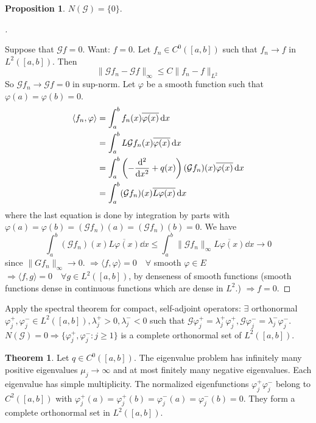 \documentclass{article}
\theoremstyle{definition}
\newtheorem{thm}{Theorem}
\newtheorem{prop}{Proposition}
\newenvironment{proofs}[1][\proofname]{%
  \begin{proof}[#1]$ $\par\nobreak\ignorespaces
}{%
  \end{proof}
}
\newcommand{\G}{\mathcal G}
\begin{document}
\begin{prop}
	$N(\G) = \{0\}$.
\end{prop}

\begin{proofs}
	Suppose that $\G f = 0$.
	Want: $f = 0$.
	Let $f_n \in C^0([a, b])$ such that $f_n \to f$ in $L^2([a, b])$.
	Then 
	\[
		\|\G f_n - \G f\|_{\infty} \leq C \|f_n - f\|_{L^2}
	\]
	So $\G f_n \to \G f = 0$ in sup-norm.
	Let $\varphi$ be a smooth function such that $\varphi(a) = \varphi(b) = 0$.
	\[
		\begin{split}
			\langle f_n , \varphi \rangle &= \int_a^b f_n(x) \overline{\varphi(x)} \dd{x}\\
			&= \int_a^b L \G f_n(x) \overline{\varphi(x)} \dd{x}\\
			&= \int_a^b \left( - \dv[2]{x} + q(x) \right)(\G f_n)(x) \overline{\varphi(x)} \dd{x}\\
			&= \int_a^b (\G f_n)(x) \overline{L \varphi(x)} \dd{x}
		\end{split}
	\]	
	where the last equation is done by integration by parts with $\varphi(a) = \varphi(b) = (\G f_n)(a) = (\G f_n)(b) = 0$.
	We have
	\[
		\int_a^b (\G f_n)(x) \overline{L \varphi(x)} \dd{x} \leq \int_a^b \|\G f_n\|_\infty \overline{L \varphi(x)} \dd{x} \to 0
	\]
	since $\|G f_n\|_\infty \to 0$.
	$\Rightarrow \langle f, \varphi \rangle = 0 \quad \forall$ smooth $\varphi \in E$
	$\Rightarrow \langle f, g \rangle = 0 \quad \forall g \in L^2([a, b])$, by denseness of smooth functions (smooth functions dense in continuous functions which are dense in $L^2$.)
	$\Rightarrow f = 0$.
\end{proofs}

Apply the spectral theorem for compact, self-adjoint operators:
$\exists$ orthonormal $\varphi_j^+, \varphi_j^- \in L^2([a, b]), \lambda_j^+ > 0, \lambda_j^- < 0$ such that $\G \varphi_j^+ = \lambda_j^+ \varphi_j^+, \G \varphi_j^- = \lambda_j^- \varphi_j^-$.
$N(\G) = 0 \Rightarrow \{\varphi_j^+, \varphi_j^-: j \geq 1\}$ is a complete orthonormal set of $L^2([a, b])$.

\begin{thm}
	Let $q \in C^0([a, b])$.
	The eigenvalue problem has infinitely many positive eigenvalues $\mu_j \to \infty$ and at most finitely many negative eigenvalues.
	Each eigenvalue has simple multiplicity.
	The normalized eigenfunctions $\varphi_j^+ \varphi_j^-$ belong to $C^2([a, b])$ with $\varphi_j^+(a) = \varphi_j^+(b) = \varphi_j^-(a) = \varphi_j^-(b) = 0$.
	They form a complete orthonormal set in $L^2([a, b])$.
\end{thm}
\end{document}
